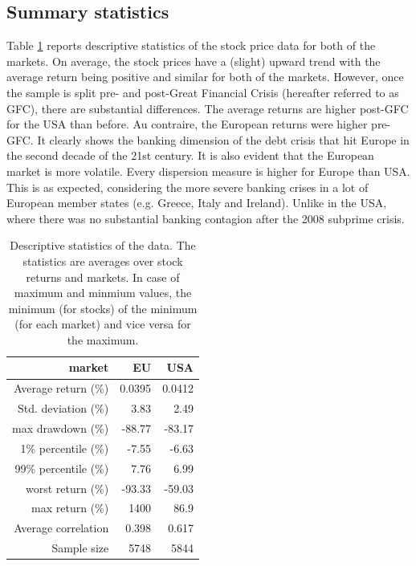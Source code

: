 \documentclass[12pt]{article}
\begin{document}
\subsection{Summary statistics}\label{subsection:data_descrptive}

Table \ref{table:descriptive} reports descriptive statistics of the stock price data for both of the markets. On average, the stock prices have a (slight) upward trend with the average return being positive and similar for both of the markets. However, once the sample is split pre- and post-Great Financial Crisis (hereafter referred to as GFC), there are substantial differences. The average returns are higher post-GFC for the USA than before. Au contraire, the European returns were higher pre-GFC. It clearly shows the banking dimension of the debt crisis that hit Europe in the second decade of the 21st century. It is also evident that the European market is more volatile. Every dispersion measure is higher for Europe than USA. This is as expected, considering the more severe banking crises in a lot of European member states (e.g. Greece, Italy and Ireland). Unlike in the USA, where there was no substantial banking contagion after the 2008 subprime crisis. 

\begin{table}[h]
	\centering
	\begin{tabular}{r|r|r}
		market & EU & USA \\ 
		\hline \hline
		Average return (\%)& 0.0395 & 0.0412 \\ 
		Std. deviation (\%)& 3.83 & 2.49 \\ 
		max drawdown (\%)& -88.77 & -83.17 \\
		1\% percentile (\%)& -7.55 & -6.63 \\ 
		99\% percentile (\%)& 7.76 & 6.99 \\ 
		worst return (\%)& -93.33 & -59.03 \\ 
		max return (\%)& 1400 &   86.9 \\ 
		Average correlation & 0.398 & 0.617 \\
		Sample size & 5748 & 5844 \\ 
	\end{tabular}
	\caption{Descriptive statistics of the data. The statistics are averages over stock returns and markets. In case of maximum and minmium values, the minimum (for stocks) of the minimum (for each market) and vice versa for the maximum.}
	\label{table:descriptive}
\end{table}
\end{document}
